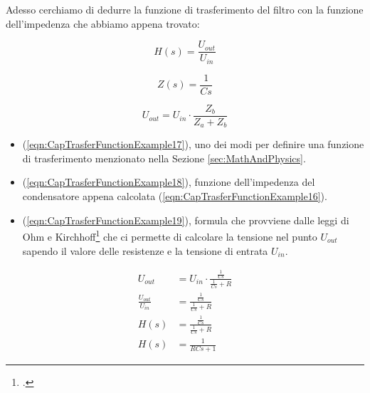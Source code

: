 \documentclass[a4paper, 10pt, final]{article} %
\begin{document}
    \noindent Adesso cerchiamo di dedurre la funzione di trasferimento del filtro con la funzione dell'impedenza che abbiamo appena trovato:
    \begin{figure}[H]
        \centering
        \begin{minipage}[b]{.3\linewidth}
            \centering
            \begin{equation} \label{eqn:CapTrasferFunctionExample17}
                H(s) = \frac{U_{out}}{U_{in}}
            \end{equation}
        \end{minipage}
        \hspace{0.04\linewidth}
        \begin{minipage}[b]{.3\linewidth}
            \centering
            \begin{equation} \label{eqn:CapTrasferFunctionExample18}
                Z(s) = \frac{1}{C s}
            \end{equation}
        \end{minipage}
        \hspace*{0.04\linewidth}
        \begin{minipage}[b]{.3\linewidth}
            \centering
            \begin{equation} \label{eqn:CapTrasferFunctionExample19}
                U_{out} = U_{in} \cdot \frac{Z_b}{Z_a + Z_b}
            \end{equation}
        \end{minipage}
    \end{figure}
    \begin{itemize}
        \item (\ref{eqn:CapTrasferFunctionExample17}), uno dei modi per definire una funzione di trasferimento menzionato nella Sezione \ref{sec:MathAndPhysics}.
        \item (\ref{eqn:CapTrasferFunctionExample18}), funzione dell'impedenza del condensatore appena calcolata (\ref{eqn:CapTrasferFunctionExample16}).
        \item (\ref{eqn:CapTrasferFunctionExample19}), formula che provviene dalle leggi di Ohm e Kirchhoff\footcite[]{Kirchhoff:Wiki} che ci permette di calcolare la tensione nel punto $U_{out}$ sapendo il valore delle resistenze e la tensione di entrata $U_{in}$.
    \end{itemize}
    \begin{align}
        U_{out} &= U_{in} \cdot \frac{\frac{1}{C s}}{\frac{1}{C s}+R} \label{eqn:CapTrasferFunctionExample20} \\
        \frac{U_{out}}{U_{in}} &= \frac{\frac{1}{C s}}{\frac{1}{C s}+R} \label{eqn:CapTrasferFunctionExample21} \\
        H(s) &= \frac{\frac{1}{C s}}{\frac{1}{C s}+R} \label{eqn:CapTrasferFunctionExample22} \\
        H(s) &= \frac{1}{R C s + 1} \label{eqn:CapTrasferFunctionExample23}
    \end{align}
\end{document}
